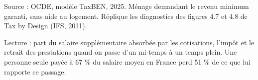 Source : OCDE, modèle TaxBEN, 2025. Ménage demandant le revenu minimum garanti, sans aide au logement. Réplique les diagnostics des figures 4.7 et 4.8 de Tax by Design (IFS, 2011).\par Lecture : part du salaire supplémentaire absorbée par les cotisations, l'impôt et le retrait des prestations quand on passe d'un mi-temps à un temps plein. Une personne seule payée à 67 \% du salaire moyen en France perd 51 \% de ce que lui rapporte ce passage.
